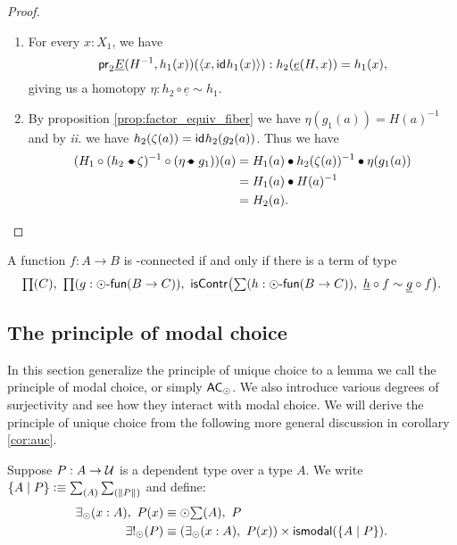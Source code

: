 \begin{proof}
\begin{enumerate}
\item For every $x:X_1$, we have
\begin{equation*}
\mathsf{pr}_{2}\underline{E}(H^{-1},h_1(x))({\langle x,\mathsf{id}_{}{h_1(x)}\rangle}):h_2(\underline{e}(H,x))= h_1(x),
\end{equation*}
giving us a homotopy $\eta:h_2\circ \underline{e}\sim h_1$.
\item By proposition \ref{prop:factor_equiv_fiber} we have $\eta(g_1(a))=H(a)^{-1}$ and by {\it ii.} we have
$h_2(\zeta(a))=\mathsf{id}_{}{h_2(g_2(a))}$. Thus we have
\begin{align*}
(H_1 \circ(h_2\leftwhisker\zeta)^{-1}\circ(\eta\rightwhisker g_1))(a) & = H_1(a)\bullet h_2(\zeta(a))^{-1}\bullet \eta(g_1(a))\\
& = H_1(a)\bullet H(a)^{-1}\\
& = H_2(a).
\end{align*}
\end{enumerate}
\end{proof}

\begin{cor}
A function $f:A\to B$ is \modal-connected if and only if there is a term of type
\begin{equation*}
\prd C\prd{g:\modalfunc(B\to C)} \iscontr\big(\sm{h:\modalfunc(B\to C)}\underline{h}\circ
f\sim\underline{g}\circ f\big).
\end{equation*}
\end{cor}

\subsection{The principle of modal choice}\label{sec:ac_truncated}

In this section generalize the principle of unique choice to a lemma we call the principle of modal
choice, or simply $\mathsf{AC}_{\odot}$. We also introduce various degrees of surjectivity and see how they interact with modal choice.
We will derive
the principle of unique choice from the following more general discussion in corollary \ref{cor:auc}.

\begin{defn}
Suppose $P:A\to\mathcal{U}$ is a dependent type over a type $A$. We write $\{A\mid P\}\defeq\sm{A}{\brck{P}}$ and define:
\begin{align*}
\existsmodal(x:A),\ P(x) & \equiv \modal\sm{A}P\\
\existsmodalunique(P) & \equiv  (\existsmodal(x:A),\ P(x))\times\ismodal(\{A\mid P\}).
\end{align*}
\end{defn}

